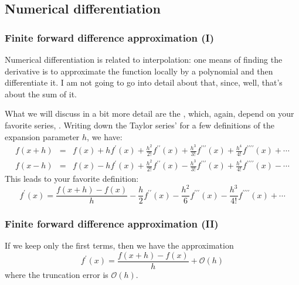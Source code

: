 \documentclass[hyperref={colorlinks=true}]{beamer}
\begin{document}
\subsection[Numerical differentiation]{Numerical differentiation}

\begin{frame}%
  \frametitle{Finite forward difference approximation (I)}

    Numerical differentiation is related to interpolation: one means of finding the derivative is to approximate the function locally by a polynomial and then differentiate it. I am not going to go into detail about that, since, well, that's about the sum of it.

  \mysp
  
  What we will discuss in a bit more detail are the , which, again, depend on your favorite series, . Writing down the Taylor series' for a few definitions of the expansion parameter $h$, we have:
  \begin{eqnarray}
    f(x+h) &=& f(x) + hf^{\prime}(x) + \frac{h^2}{2!}f^{\prime\prime}(x) + \frac{h^3}{3!}f^{\prime\prime\prime}(x)+\frac{h^4}{4!}f^{\prime\prime\prime\prime}(x) + \cdots \nonumber \\
    f(x-h) &=& f(x) - hf^{\prime}(x) + \frac{h^2}{2!}f^{\prime\prime}(x) - \frac{h^3}{3!}f^{\prime\prime\prime}(x)+\frac{h^4}{4!}f^{\prime\prime\prime\prime}(x) - \cdots \nonumber 
  \end{eqnarray}
  This leads to your favorite definition:
  \begin{equation}
    f^{\prime}(x) = \frac{f(x+h) - f(x)}{h} - \frac{h}{2}f^{\prime\prime}(x) - \frac{h^2}{6}f^{\prime\prime\prime}(x) - \frac{h^3}{4!}f^{\prime\prime\prime\prime}(x) + \cdots \nonumber 
  \end{equation}
  

\end{frame}


\begin{frame}%
  \frametitle{Finite forward difference approximation (II)}

  If we keep only the first terms, then we have the approximation
  \begin{equation}
    f^{\prime}(x) = \frac{f(x+h) - f(x)}{h} + \mathcal{O}(h)  
  \end{equation}
  where the truncation error is $\mathcal{O}(h)$. 
  
  \mysp
  
  \centering {}

\end{frame}
\end{document}
